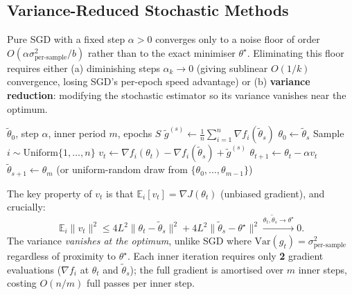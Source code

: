 \documentclass[11pt,a4paper]{article}
\theoremstyle{definition}
\begin{document}
\subsection{Variance-Reduced Stochastic Methods}

Pure SGD with a fixed step $\alpha > 0$ converges only to a noise floor of order $O(\alpha \sigma^2_{\text{per-sample}}/b)$ rather than to the exact minimiser $\theta^{\star}$. Eliminating this floor requires either (a) diminishing steps $\alpha_k \to 0$ (giving sublinear $O(1/k)$ convergence, losing SGD's per-epoch speed advantage) or (b) \textbf{variance reduction}: modifying the stochastic estimator so its variance vanishes near the optimum.

\begin{algorithm}[H]
\caption{SVRG (Stochastic Variance Reduced Gradient)}
\label{alg:svrg}
\begin{algorithmic}[1]
\Require $\tilde{\theta}_0$, step $\alpha$, inner period $m$, epochs $S$
    \State $\tilde{g}^{(s)} \gets \frac{1}{n}\sum_{i=1}^n \nabla f_i(\tilde{\theta}_s)$ 
    \State $\theta_0 \gets \tilde{\theta}_s$
        \State Sample $i \sim \text{Uniform}\{1, \ldots, n\}$
        \State $v_t \gets \nabla f_i(\theta_t) - \nabla f_i(\tilde{\theta}_s) + \tilde{g}^{(s)}$ 
        \State $\theta_{t+1} \gets \theta_t - \alpha v_t$
    \EndFor
    \State $\tilde{\theta}_{s+1} \gets \theta_m$ (or uniform-random draw from $\{\theta_0, \ldots, \theta_{m-1}\}$)
\EndFor
\end{algorithmic}
\end{algorithm}

The key property of $v_t$ is that $\mathbb{E}_i[v_t] = \nabla J(\theta_t)$ (unbiased gradient), and crucially:
\begin{equation}
\mathbb{E}_i\|v_t\|^2 \leq 4L^2\|\theta_t - \tilde{\theta}_s\|^2 + 4L^2\|\tilde{\theta}_s - \theta^{\star}\|^2 \xrightarrow{\theta_t, \tilde{\theta}_s \to \theta^{\star}} 0.
\end{equation}
The variance \emph{vanishes at the optimum}, unlike SGD where $\text{Var}(g_t) = \sigma^2_{\text{per-sample}}$ regardless of proximity to $\theta^{\star}$. Each inner iteration requires only \textbf{2} gradient evaluations ($\nabla f_i$ at $\theta_t$ and $\tilde{\theta}_s$); the full gradient is amortised over $m$ inner steps, costing $O(n/m)$ full passes per inner step.
\end{document}
